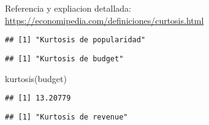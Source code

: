 \documentclass[
]{article}
\newenvironment{Shaded}{\begin{snugshade}}{\end{snugshade}}
\newcommand{\CommentTok}[1]{\textcolor[rgb]{0.56,0.35,0.01}{\textit{#1}}}
\newcommand{\DocumentationTok}[1]{\textcolor[rgb]{0.56,0.35,0.01}{\textbf{\textit{#1}}}}
\newcommand{\FunctionTok}[1]{\textcolor[rgb]{0.00,0.00,0.00}{#1}}
\newcommand{\NormalTok}[1]{#1}
\newcommand{\OtherTok}[1]{\textcolor[rgb]{0.56,0.35,0.01}{#1}}
\newcommand{\SpecialCharTok}[1]{\textcolor[rgb]{0.00,0.00,0.00}{#1}}
\newcommand{\StringTok}[1]{\textcolor[rgb]{0.31,0.60,0.02}{#1}}
\begin{document}
Referencia y expliacion detallada:
\url{https://economipedia.com/definiciones/curtosis.html}

\begin{Shaded}
\end{Shaded}

\begin{verbatim}
## [1] "Kurtosis de popularidad"
\end{verbatim}

\begin{Shaded}
\end{Shaded}

\begin{verbatim}
## [1] "Kurtosis de budget"
\end{verbatim}

\begin{Shaded}
\begin{Highlighting}[]
\FunctionTok{kurtosis}\NormalTok{(budget)}
\end{Highlighting}
\end{Shaded}

\begin{verbatim}
## [1] 13.20779
\end{verbatim}

\begin{Shaded}
\end{Shaded}

\begin{verbatim}
## [1] "Kurtosis de revenue"
\end{verbatim}
\end{document}
